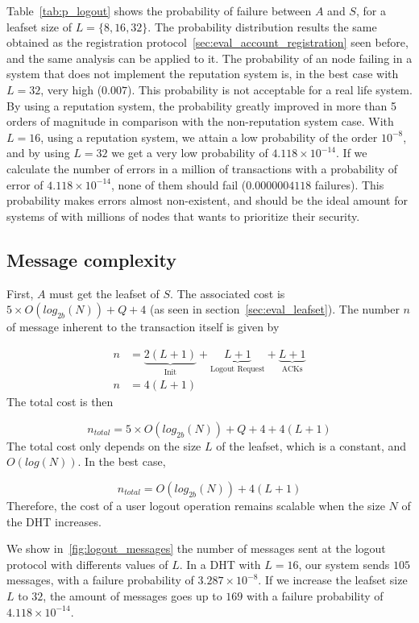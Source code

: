     Table~\eqref{tab:p_logout} shows the probability of failure
between $A$ and $S$, for a leafset size of $L = \{8,16,32\}$.
  The probability distribution results the same obtained as the registration
protocol~\ref{sec:eval_account_registration} seen before, and the same analysis
can be applied to it. The probability
of an node failing in a system that does not implement the reputation system
is, in the best case with $L=32$, very high ($0.007$). This probability is not
acceptable for a real life system.  By using a reputation system, the probability greatly
improved in more than 5 orders of magnitude in comparison with the
non-reputation system case. With $L=16$, using a reputation system, we attain
a low probability of the order $10^{-8}$, and by using $L=32$ we get a very low
probability of $4.118 \times 10^{-14}$. If we calculate the number of
errors in a million of transactions with a probability of error of $4.118
\times 10^{-14}$, none of them should fail ($0.0000004118$ failures). This probability
makes errors almost non-existent, and should be the ideal amount for systems of with
millions of nodes that wants to prioritize their security.

    
  \subsection{Message complexity}
    First, $A$ must get the leafset of $S$. The associated cost is $5
\times O(log_{2b}(N)) + Q + 4$ (as seen in section~\ref{sec:eval_leafset}).
    The number $n$ of message inherent to the transaction itself is given by

    \begin{align}
      n &= \underbrace{2(L+1)}_\text{Init} +  \underbrace{L+1}_\text{Logout Request} + \underbrace{L+1}_\text{ACKs}\\
      n &= 4(L+1)
    \end{align}
     The total cost is then

    $$
      n_{total} = 5 \times O(log_{2b}(N)) + Q + 4 + 4(L+1)
    $$    
    The total cost only depends on the size $L$ of the leafset, which is a
constant, and $O(log(N))$. In the best case, 

    $$
      n_{total} = O(log_{2b}(N)) + 4(L+1)
    $$
    Therefore, the cost of a user logout operation remains scalable when the size $N$ of the DHT increases.

    We show in~\ref{fig:logout_messages} the number of messages sent at
the logout protocol with differents values of $L$. In a DHT with
$L = 16$, our system sends $105$ messages, with a failure probability of
 $3.287 \times 10^{-8}$. If we increase the leafset size $L$ to $32$, the amount of
messages goes up to $169$ with a failure probability of $4.118 \times 10^{-14}$.


